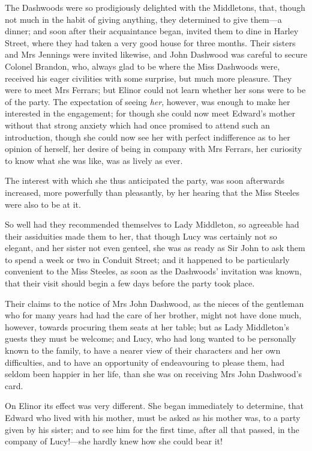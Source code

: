 The Dashwoods were so prodigiously delighted with the Middletons, that, though not much in the habit of giving anything, they determined to give them—a dinner; and soon after their acquaintance began, invited them to dine in Harley Street, where they had taken a very good house for three months. Their sisters and Mrs Jennings were invited likewise, and John Dashwood was careful to secure Colonel Brandon, who, always glad to be where the Miss Dashwoods were, received his eager civilities with some surprise, but much more pleasure. They were to meet Mrs Ferrars; but Elinor could not learn whether her sons were to be of the party. The expectation of seeing \textit{her}, however, was enough to make her interested in the engagement; for though she could now meet Edward's mother without that strong anxiety which had once promised to attend such an introduction, though she could now see her with perfect indifference as to her opinion of herself, her desire of being in company with Mrs Ferrars, her curiosity to know what she was like, was as lively as ever.

The interest with which she thus anticipated the party, was soon afterwards increased, more powerfully than pleasantly, by her hearing that the Miss Steeles were also to be at it.

So well had they recommended themselves to Lady Middleton, so agreeable had their assiduities made them to her, that though Lucy was certainly not so elegant, and her sister not even genteel, she was as ready as Sir John to ask them to spend a week or two in Conduit Street; and it happened to be particularly convenient to the Miss Steeles, as soon as the Dashwoods' invitation was known, that their visit should begin a few days before the party took place.

Their claims to the notice of Mrs John Dashwood, as the nieces of the gentleman who for many years had had the care of her brother, might not have done much, however, towards procuring them seats at her table; but as Lady Middleton's guests they must be welcome; and Lucy, who had long wanted to be personally known to the family, to have a nearer view of their characters and her own difficulties, and to have an opportunity of endeavouring to please them, had seldom been happier in her life, than she was on receiving Mrs John Dashwood's card.

On Elinor its effect was very different. She began immediately to determine, that Edward who lived with his mother, must be asked as his mother was, to a party given by his sister; and to see him for the first time, after all that passed, in the company of Lucy!—she hardly knew how she could bear it!


